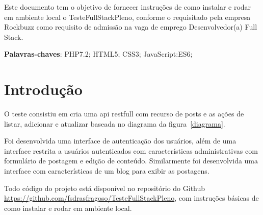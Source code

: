 \documentclass[
	article,			%
	11pt,				%
	oneside,			%
	a4paper,			%
	english,			%
	brazil,				%
	sumario=tradicional
	]{abntex2}
\begin{document}
\frenchspacing 


%
%
\maketitle

\begin{resumoumacoluna}
 Este documento tem o objetivo de fornecer instruções de como instalar e rodar em ambiente local o TesteFullStackPleno, conforme o requisitado pela empresa Rockbuzz como requisito de admissão na vaga de emprego Desenvolvedor(a) Full Stack. 
 
 \vspace{\onelineskip}
 
 \noindent
 \textbf{Palavras-chaves}: PHP7.2; HTML5; CSS3; JavaScript:ES6; 
\end{resumoumacoluna}


\textual

\section*{Introdução}
O teste consistiu em cria uma api restfull com recurso de posts e as ações de listar, adicionar e atualizar baseada no diagrama  da figura~\ref{diagrama}. 

Foi desenvolvida uma interface de autenticação dos usuários, além de uma interface restrita a usuários autenticados com características administrativas com formulário de postagem e edição de conteúdo.  Similarmente foi desenvolvida uma interface com características de um blog para exibir as postagens.  

Todo código do projeto está disponível no repositório do Github \url{https://github.com/fsdrasfragoso/TesteFullStackPleno}, com instruções básicas de como instalar e rodar em ambiente local.
\end{document}

